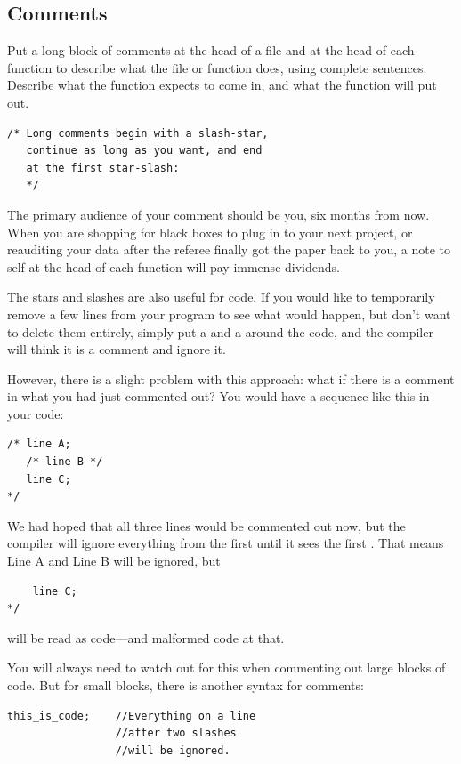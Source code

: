 \documentclass[12pt]{article}
\begin{document}
\subsection{Comments} 
Put a long block of comments 
at the head of a file and at the head of each function to describe what
the file or function does, using complete sentences. Describe what the
function expects to come in, and what the function will put out.
\startonecol
\begin{verbatim}
/* Long comments begin with a slash-star,
   continue as long as you want, and end 
   at the first star-slash:   
   */
\end{verbatim}
\endonecol

The primary audience of your comment should be you, six months from
now. When you are shopping for black boxes to plug in to your next project,
or reauditing your data after the referee finally got the paper back
to you, a note to self at the head of each function will pay immense
dividends.


The stars and slashes are also useful for  code. If
you would
like to temporarily remove a few lines from your program to see what
would
happen, but don't want to delete them entirely, simply put a \cinline{/*}
and a \cinline{*/} around the code, and the compiler will think it is a
comment and ignore it.

However, there is a slight problem with this approach: what if there is a comment in what you had just
commented out? You would have a sequence like this in your code: 
\begin{lstlisting}
/* line A; 
   /* line B */ 
   line C; 
*/
\end{lstlisting}
We had hoped that all three lines would be commented out now, but the compiler will ignore everything
from the first \cinline{/*} until it sees the first \cinline{*/}. That means Line A and Line B will be ignored,
but 
\begin{lstlisting}
    line C; 
*/
\end{lstlisting}
will be read as code---and malformed code at that.

You will always need to watch out for this when commenting out large blocks of code. But for small
blocks, there is another syntax for comments:
\begin{verbatim}
this_is_code;    //Everything on a line 
                 //after two slashes 
                 //will be ignored.
\end{verbatim}
\end{document}
